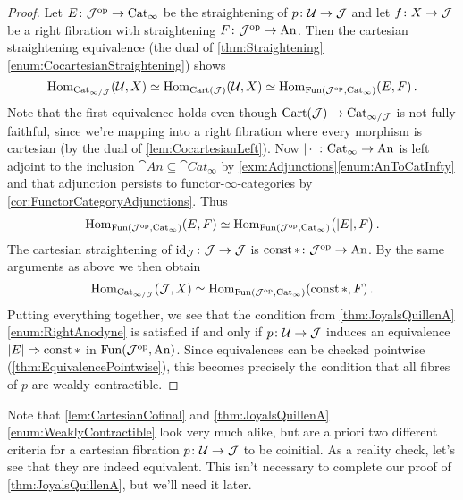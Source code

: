 \begin{proof}
	Let $E\colon \mathcal{J}^{\mathrm{op}}\rightarrow\mathrm{Cat}_\infty$ be the straightening of $p\colon \mathcal{U}\rightarrow \mathcal{J}$ and let $f\colon X\rightarrow \mathcal{J}$ be a right fibration with straightening $F\colon \mathcal{J}^{\mathrm{op}}\rightarrow \mathrm{An}$. Then the cartesian straightening equivalence (the dual of \cref{thm:Straightening}\cref{enum:CocartesianStraightening}) shows
	\begin{equation*}
		\operatorname{Hom}_{\mathrm{Cat}_{\infty/\mathcal{J}}}(\mathcal{U},X)\simeq \operatorname{Hom}_{\mathrm{Cart}(\mathcal{J})}(\mathcal{U},X)\simeq \operatorname{Hom}_{\operatorname{Fun}(\mathcal{J}^{\mathrm{op}},\mathrm{Cat}_\infty)}(E,F)\,.
	\end{equation*}
	Note that the first equivalence holds even though $\mathrm{Cart}(\mathcal{J})\rightarrow\mathrm{Cat}_{\infty/\mathcal{J}}$ is not fully faithful, since we're mapping into a right fibration where every morphism is cartesian (by the dual of \cref{lem:CocartesianLeft}). Now $\abs*{\,\cdot\,}\colon \cat{Cat}_\infty\rightarrow \cat{An}$ is left adjoint to the inclusion $\cat{An}\subseteq \cat{Cat}_\infty$ by \cref{exm:Adjunctions}\cref{enum:AnToCatInfty} and that adjunction persists to functor-$\infty$-categories by \cref{cor:FunctorCategoryAdjunctions}. Thus
	\begin{equation*}
		\Hom_{\Fun(\Jj^\op,\cat{Cat}_\infty)}(E,F)\simeq \Hom_{\Fun(\Jj^\op,\cat{Cat}_\infty)}\bigl(\abs{E},F\bigr)\,.
	\end{equation*}
	The cartesian straightening of $\operatorname{id}_{\mathcal{J}}\colon \mathcal{J}\rightarrow \mathcal{J}$ is $\operatorname{const} *\colon \mathcal{J}^{\mathrm{op}}\rightarrow\mathrm{An}$. By the same arguments as above we then obtain
	\begin{equation*}
		\operatorname{Hom}_{\mathrm{Cat}_{\infty/\mathcal{J}}}(\mathcal{J},X)\simeq \operatorname{Hom}_{\operatorname{Fun}(\mathcal{J}^{\mathrm{op}},\mathrm{Cat}_\infty)}(\operatorname{const} *,F)\,.
	\end{equation*}
	Putting everything together, we see that the condition from \cref{thm:JoyalsQuillenA}\cref{enum:RightAnodyne} is satisfied if and only if $p\colon\mathcal{U}\rightarrow \mathcal{J}$ induces an equivalence $\abs*{E}\Rightarrow \const *$ in $\operatorname{Fun}(\mathcal{J}^{\mathrm{op}},\mathrm{An})$. Since equivalences can be checked pointwise (\cref{thm:EquivalencePointwise}), this becomes precisely the condition that all fibres of $p$ are weakly contractible.
\end{proof}
Note that \cref{lem:CartesianCofinal} and \cref{thm:JoyalsQuillenA}\cref{enum:WeaklyContractible} look very much alike, but are a priori two different criteria for a cartesian fibration $p\colon \mathcal{U}\rightarrow\mathcal{J}$ to be coinitial. As a reality check, let's see that they are indeed equivalent. This isn't necessary to complete our proof of \cref{thm:JoyalsQuillenA}, but we'll need it later.
